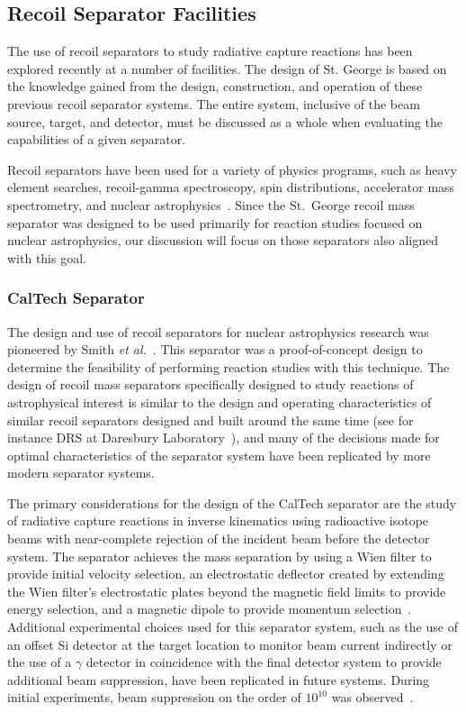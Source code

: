 \subsection{Recoil Separator Facilities}
\label{sec:prevwork}

The use of recoil separators to study radiative capture reactions has
been explored recently at a number of facilities. The design of St.
George is based on the knowledge gained from the design, construction,
and operation of these previous recoil separator systems. The entire
system, inclusive of the beam source, target, and detector, must be
discussed as a whole when evaluating the capabilities of a given
separator.

Recoil separators have been used for a variety of physics programs, such
as heavy element searches, recoil-gamma spectroscopy, spin
distributions, accelerator mass spectrometry, and nuclear
astrophysics~\cite{Davids2003}. Since the St.\ George recoil mass
separator was designed to be used primarily for reaction studies focused
on nuclear astrophysics, our discussion will focus on those separators
also aligned with this goal.

\subsubsection{CalTech Separator}
The design and use of recoil separators for nuclear astrophysics
research was pioneered by Smith \textit{et al.}~\cite{Smith1991}. This
separator was a proof-of-concept design to determine the feasibility of
performing reaction studies with this technique. The design of recoil
mass separators specifically designed to study reactions of
astrophysical interest is similar to the design and operating
characteristics of similar recoil separators designed and built around
the same time (see for instance DRS at Daresbury
Laboratory~\cite{James1988}), and many of the decisions made for optimal
characteristics of the separator system have been replicated by more
modern separator systems.

The primary considerations for the design of the CalTech separator are
the study of radiative capture reactions in inverse kinematics using
radioactive isotope beams with near-complete rejection of the incident
beam before the detector system. The separator achieves the mass
separation by using a Wien filter to provide initial velocity selection,
an electrostatic deflector created by extending the Wien filter's
electrostatic plates beyond the magnetic field limits to provide energy
selection, and a magnetic dipole to provide momentum
selection~\cite{Smith1991}. Additional experimental choices used for
this separator system, such as the use of an offset Si detector at the
target location to monitor beam current indirectly or the use of a
$\gamma$ detector in coincidence with the final detector system to
provide additional beam suppression, have been replicated in future
systems. During initial experiments, beam suppression on the order of
$10^{10}$ was observed~\cite{Smith1991}.


